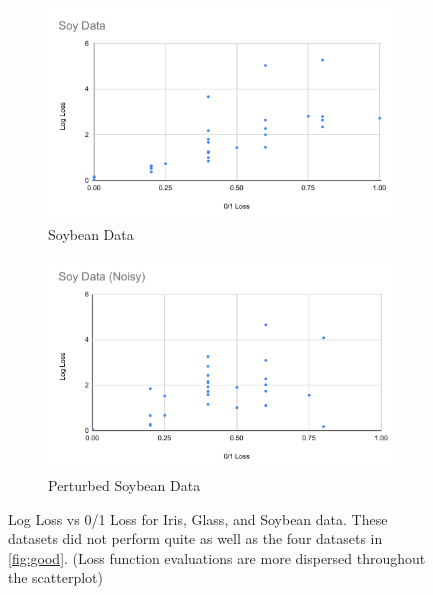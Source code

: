 \documentclass[twoside,11pt]{article}
\begin{document}
\begin{figure}[h!]
   \begin{subfigure}[b]{0.45\linewidth}
    \includegraphics[width=\linewidth]{images/Soy.pdf}
    \caption{Soybean Data}
  \end{subfigure}
  \begin{subfigure}[b]{0.45\linewidth}
    \includegraphics[width=\linewidth]{images/Soy(noise).pdf}
    \caption{Perturbed Soybean Data}
  \end{subfigure}
  
  \caption{Log Loss vs 0/1 Loss for Iris, Glass, and Soybean data. These datasets did not perform quite as well as the four datasets in \ref{fig:good}. (Loss function evaluations are more dispersed throughout the scatterplot)}
  \label{fig:ugly}
\end{figure}
\end{document}

